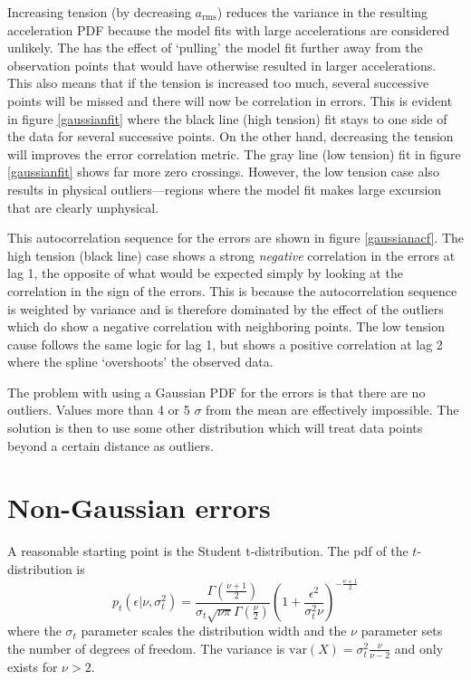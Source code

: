 \documentclass[twocol]{ametsoc}
\begin{document}
Increasing tension (by decreasing $a_{\textrm{rms}}$) reduces the variance in the resulting acceleration PDF because the model fits with large accelerations are considered unlikely. The has the effect of `pulling' the model fit further away from the observation points that would have otherwise resulted in larger accelerations. This also means that if the tension is increased too much, several successive points will be missed and there will now be correlation in errors. This is evident in figure \ref{gaussianfit} where the black line (high tension) fit stays to one side of the data for several successive points. On the other hand, decreasing the tension will improves the error correlation metric. The gray line (low tension) fit in figure \ref{gaussianfit} shows far more zero crossings. However, the low tension case also results in physical outliers---regions where the model fit makes large excursion that are clearly unphysical.

This autocorrelation sequence for the errors are shown in figure \ref{gaussianacf}. The high tension (black line) case shows a strong \emph{negative} correlation in the errors at lag 1, the opposite of what would be expected simply by looking at the correlation in the sign of the errors. This is because the autocorrelation sequence is weighted by variance and is therefore dominated by the effect of the outliers which do show a negative correlation with neighboring points. The low tension cause follows the same logic for lag 1, but shows a positive correlation at lag 2 where the spline `overshoots' the observed data.

The problem with using a Gaussian PDF for the errors is that there are no outliers. Values more than 4 or 5 $\sigma$ from the mean are effectively impossible. The solution is then to use some other distribution which will treat data points beyond a certain distance as outliers.

\section{Non-Gaussian errors}

A reasonable starting point is the Student t-distribution. The pdf of the $t$-distribution is
\begin{equation}
\label{student_pdf}
p_t\left(\epsilon |\nu,\sigma_t^2\right) = \frac{\Gamma\left( \frac{\nu + 1}{2} \right)}{\sigma_t \sqrt{\nu \pi} \Gamma\left(\frac{\nu}{2}\right)} \left( 1 + \frac{\epsilon^2}{\sigma_t^2 \nu} \right)^{-\frac{\nu+1}{2}}
\end{equation}
where the $\sigma_t$ parameter scales the distribution width and the $\nu$ parameter sets the number of degrees of freedom. The variance is $\textrm{var}(X)=\sigma_t^2 \frac{\nu}{\nu-2}$ and only exists for $\nu > 2$.
\end{document}
